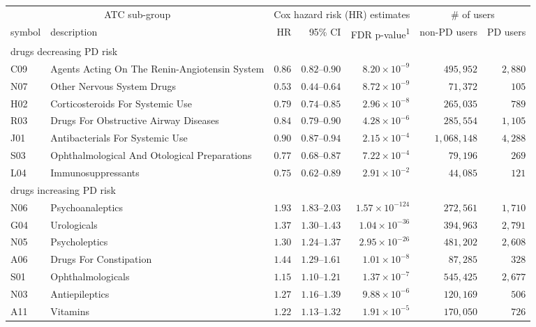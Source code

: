 \setlength{\LTpost}{0mm}
\begin{longtable}{llrrrrr}
\toprule
\multicolumn{2}{c}{ATC sub-group} & \multicolumn{3}{c}{Cox hazard risk (HR) estimates} & \multicolumn{2}{c}{\# of users} \\ 
\cmidrule(lr){1-2} \cmidrule(lr){3-5} \cmidrule(lr){6-7}
symbol & description & HR & 95\% CI & FDR p-value\textsuperscript{1} & non-PD users & PD users \\ 
\midrule
\multicolumn{7}{l}{drugs decreasing PD risk} \\ 
\midrule
C09 & Agents Acting On The Renin-Angiotensin System & $0.86$ & $0.82$–$0.90$ & $8.20 \times 10^{-9}$ & $495,952$ & $2,880$ \\ 
N07 & Other Nervous System Drugs & $0.53$ & $0.44$–$0.64$ & $8.72 \times 10^{-9}$ & $71,372$ & $105$ \\ 
H02 & Corticosteroids For Systemic Use & $0.79$ & $0.74$–$0.85$ & $2.96 \times 10^{-8}$ & $265,035$ & $789$ \\ 
R03 & Drugs For Obstructive Airway Diseases & $0.84$ & $0.79$–$0.90$ & $4.28 \times 10^{-6}$ & $285,554$ & $1,105$ \\ 
J01 & Antibacterials For Systemic Use & $0.90$ & $0.87$–$0.94$ & $2.15 \times 10^{-4}$ & $1,068,148$ & $4,288$ \\ 
S03 & Ophthalmological And Otological Preparations & $0.77$ & $0.68$–$0.87$ & $7.22 \times 10^{-4}$ & $79,196$ & $269$ \\ 
L04 & Immunosuppressants & $0.75$ & $0.62$–$0.89$ & $2.91 \times 10^{-2}$ & $44,085$ & $121$ \\ 
\midrule
\multicolumn{7}{l}{drugs increasing PD risk} \\ 
\midrule
N06 & Psychoanaleptics & $1.93$ & $1.83$–$2.03$ & $1.57 \times 10^{-124}$ & $272,561$ & $1,710$ \\ 
G04 & Urologicals & $1.37$ & $1.30$–$1.43$ & $1.04 \times 10^{-36}$ & $394,963$ & $2,791$ \\ 
N05 & Psycholeptics & $1.30$ & $1.24$–$1.37$ & $2.95 \times 10^{-26}$ & $481,202$ & $2,608$ \\ 
A06 & Drugs For Constipation & $1.44$ & $1.29$–$1.61$ & $1.01 \times 10^{-8}$ & $87,285$ & $328$ \\ 
S01 & Ophthalmologicals & $1.15$ & $1.10$–$1.21$ & $1.37 \times 10^{-7}$ & $545,425$ & $2,677$ \\ 
N03 & Antiepileptics & $1.27$ & $1.16$–$1.39$ & $9.88 \times 10^{-6}$ & $120,169$ & $506$ \\ 
A11 & Vitamins & $1.22$ & $1.13$–$1.32$ & $1.91 \times 10^{-5}$ & $170,050$ & $726$ \\ 

\end{longtable}
